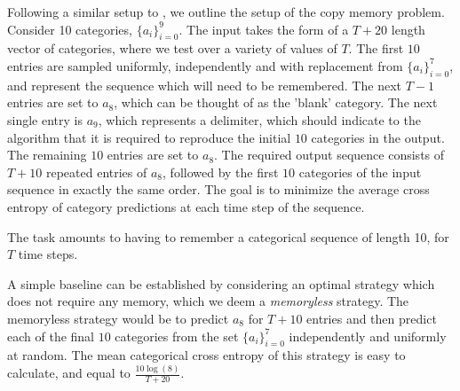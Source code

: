 \documentclass{article} %
\begin{document}
Following a similar setup to \cite{LSTM}, we outline the setup of the copy memory problem.
Consider 10 categories, $\{ a_i \}_{i=0}^9$.   
The input takes the form of a $T+20$ length vector of categories, where we test over a variety of values
of $T$. 
The first $10$ entries are sampled uniformly, independently and with replacement from $\{a_i\}_{i=0}^7$,
and represent the sequence which will need to be remembered. 
The next $T-1$ entries are set to $a_8$, which can be thought of as the 'blank' category. 
The next single entry is $a_9$, which represents a delimiter, which should indicate to the algorithm
that it is required to reproduce the initial $10$ categories in the output. 
The remaining $10$ entries are set to $a_8$. The required output sequence consists of $T+10$ 
repeated entries of $a_8$, followed by the first $10$ categories of the input sequence in exactly the
same order. The goal is to minimize the average cross entropy of category predictions 
at each time step of the sequence.
 
The task amounts to having to remember a categorical sequence of length 10, for $T$ time steps.

A simple baseline can be established by considering an optimal strategy which does not require any memory, 
which we deem a \textit{memoryless} strategy. The memoryless strategy would be to predict $a_8$ for 
$T+10$ entries and then predict each of the final $10$ categories from the set $\{a_i\}_{i=0}^7$ independently
and uniformly at random. The mean categorical cross entropy of this strategy is easy to calculate, and equal 
to $\frac{10 \log(8) }{T+20} $. 
\end{document}
